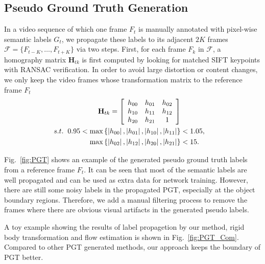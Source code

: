 \subsection{Pseudo Ground Truth Generation}
%
In a video sequence of which one frame $F_t$ is manually annotated with pixel-wise semantic labels $G_t$, we propagate these labels to its adjacent $2K$ frames $\mathcal{F}=\{F_{t-K},\ldots, F_{t+K}\}$ via two steps.
%
First, for each frame $F_k$ in $\mathcal{F}$, a homography matrix $\mathbf{H}_{tk}$ is first computed by looking for matched SIFT keypoints with RANSAC verification.
%
In order to avoid large distortion or content changes, we only keep the video frames whose transformation matrix to the reference frame $F_t$
% 
\begin{equation}
\centering
\begin{aligned}
\mathbf{H}_{tk}
=
\left[
\begin{array}{ccc}
h_{00} & h_{01} & h_{02}\\
h_{10} & h_{11} & h_{12}\\
h_{20} & h_{21} & 1\\
\end{array}
\right] \\
s.t. \hspace{0.2cm}0.95<\max{\left\{\left|h_{00}\right|,\left|h_{01}\right|,\left|h_{10}\right|,\left|h_{11}\right|\right\}}&<1.05,\\
\max{\left\{\left|h_{02}\right|,\left|h_{12}\right|,\left|h_{20}\right|,\left|h_{21}\right|\right\}}&<15.\\
\end{aligned}
\end{equation}


Fig.~\ref{fig:PGT} shows an example of the generated pseudo ground truth labels from a reference frame $F_t$. 
It can be seen that most of the semantic labels are well propagated and can be used as extra data for network training. 
% 
However, there are still some noisy labels in the propagated PGT, especially at the object boundary regions. 
%
Therefore, we add a manual filtering process to remove the frames where there are obvious visual artifacts in the generated pseudo labels.

A toy example showing the results of label propagetion by our method, rigid body transformation and flow estimation is shown in Fig.~\ref{fig:PGT_Com}.
%
Compared to other PGT generated methods, our approach keeps the boundary of PGT better.

